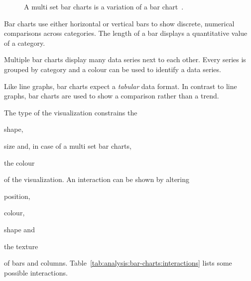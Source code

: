 \begin{figure}
  \begin{center}
    \qquad
    \caption{A multi set bar charts is a variation of a bar chart~\parencite{VisualizationCatalogue2017}.}
    \label{fig:analysis:bar-charts}
  \end{center}
\end{figure}

Bar charts use either horizontal or vertical bars to show discrete, numerical comparisons across categories.
The length of a bar displays a quantitative value of a category.

Multiple bar charts display many data series next to each other.
Every series is grouped by category and a colour can be used to identify a data series.

Like line graphs, bar charts expect a \emph{tabular} data format.
In contrast to line graphs, bar charts are used to show a comparison rather than a trend.

The type of the visualization constrains the
\begin{enumerate*}[label=(\arabic*)]
    \item shape,
    \item size and, in case of a multi set bar charts,
    \item the colour
\end{enumerate*}
of the visualization.
An interaction can be shown by altering
\begin{enumerate*}[label=(\arabic*)]
    \item position,
    \item colour,
    \item shape and
    \item the texture
\end{enumerate*}
of bars and columns.
Table~\ref{tab:analysis:bar-charts:interactions} lists some possible interactions.


